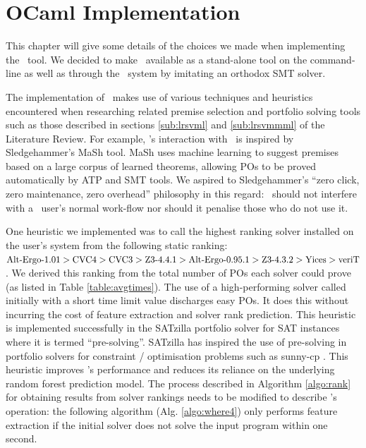 \chapter{OCaml Implementation}
\thispagestyle{nohead}
\label{Implementation}

This chapter will give some details of the choices we made when implementing the \where~tool.
We decided to make \where~available as a stand-alone tool on the command-line as well as through the \why~system by imitating an orthodox SMT solver.   

The implementation of \where~makes use of various techniques and heuristics encountered when researching related premise selection and portfolio solving tools such as those described in sections \ref{sub:lrsvml} and \ref{sub:lrsvmmml} of the Literature Review.   
For example, \where's interaction with \why~is inspired by Sledgehammer's MaSh \cite{Sledgehammer} tool. MaSh uses machine learning to suggest premises based on a large corpus of learned theorems, allowing POs to be proved automatically by ATP and SMT tools. 
We aspired to Sledgehammer's ``zero click, zero maintenance, zero overhead'' philosophy in this regard: \where~should not interfere with a \why~user's normal work-flow nor should it penalise those who do not use it.

One heuristic we implemented was to call the highest ranking solver installed on the user's system from the following static ranking:
$ \text{Alt-Ergo-1.01}\linebreak > \text{CVC4} > \text{CVC3} > \text{Z3-4.4.1} > \text{Alt-Ergo-0.95.1} > \text{Z3-4.3.2} > \text{Yices} > \text{veriT} $.
We derived this ranking from the total number of POs each solver could prove (as listed in Table \ref{table:avgtimes}).
The use of a high-performing solver called initially with a short time limit value discharges easy POs.
It does this without incurring the cost of feature extraction and solver rank prediction.
This heuristic is implemented successfully in the SATzilla  \cite{SATzilla2012} portfolio solver for SAT instances where it is termed ``pre-solving''.
SATzilla has inspired the use of pre-solving in portfolio solvers for constraint / optimisation problems such as sunny-cp \cite{sunny-cp}.
This heuristic improves \where's performance and reduces its reliance on the underlying random forest prediction model. 
The process described in Algorithm \ref{algo:rank} for obtaining results from solver rankings needs to be modified to describe \where's operation:
the following algorithm (Alg. \ref{algo:where4}) only performs feature extraction if the initial solver does not solve the input program within one second. 

